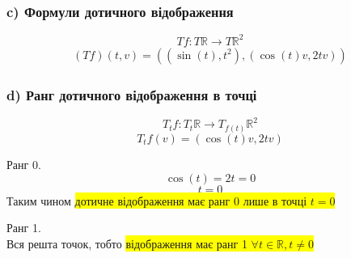 \documentclass[10pt, a4paper]{article} %
\newcommand{\R}{\mathbb{R}}
\begin{document}
\subsubsection*{c) Формули дотичного відображення}
\[Tf : T\R \to T\R^2\]
\begin{align*}
    (Tf)(t, v) = \left((\sin(t), t^2), (\cos(t)v, 2tv)\right)
\end{align*}

\subsubsection*{d) Ранг дотичного відображення в точці}
\[T_{t}f: T_{t}\R \to T_{f(t)}\R^2\]
\[T_{t}f(v) = (\cos(t)v, 2tv)\]

Ранг 0.
\[\cos(t) = 2t = 0\]
\[t = 0\]
Таким чином \colorbox{yellow}{дотичне відображення має ранг 0 лише в точці $t=0$}

Ранг 1.\\
Вся решта точок, тобто \colorbox{yellow}{відображення має ранг 1 $\forall t \in \R, t\ne 0$}
\end{document}
